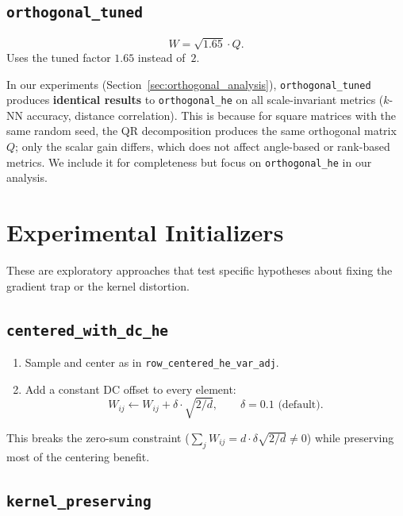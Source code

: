 \subsection{\texttt{orthogonal\_tuned}}

\begin{equation}
  W = \sqrt{1.65} \cdot Q.
\end{equation}
Uses the tuned factor $1.65$ instead of~$2$.

In our experiments (Section~\ref{sec:orthogonal_analysis}),
\texttt{orthogonal\_tuned} produces \textbf{identical results} to
\texttt{orthogonal\_he} on all scale-invariant metrics ($k$-NN
accuracy, distance correlation).  This is because for square matrices
with the same random seed, the QR decomposition produces the same
orthogonal matrix $Q$; only the scalar gain differs, which does not
affect angle-based or rank-based metrics.
We include it for completeness but focus on \texttt{orthogonal\_he}
in our analysis.

\section{Experimental Initializers}

\noindent
These are exploratory approaches that test specific hypotheses about
fixing the gradient trap or the kernel distortion.

\subsection{\texttt{centered\_with\_dc\_he}}

\begin{enumerate}
  \item Sample and center as in \texttt{row\_centered\_he\_var\_adj}.
  \item Add a constant DC offset to every element:
        \[
          W_{ij} \leftarrow W_{ij} + \delta \cdot \sqrt{2/d},
          \qquad \delta = 0.1 \text{ (default)}.
        \]
\end{enumerate}
This breaks the zero-sum constraint
($\sum_j W_{ij} = d \cdot \delta \sqrt{2/d} \neq 0$)
while preserving most of the centering benefit.

\subsection{\texttt{kernel\_preserving}}
\label{sec:kp_init}

